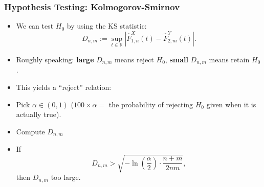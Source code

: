 \documentclass[aspectratio=169,xcolor=dvipsnames,11pt]{beamer}
\begin{document}
\begin{footnotesize}
\begin{frame}\frametitle{Hypothesis Testing: Kolmogorov-Smirnov}
\begin{block}{}
\begin{itemize}
\item We can test $H_0$ by using the KS statistic:
\[
D_{n,m} := \sup_{t \in \mathbb R} |\widehat{F}^{X}_{1,n}(t) - \widehat{F}^{Y}_{2,m}(t)|.
\]
\item Roughly speaking: \textbf{large} $D_{n,m}$ means reject $H_0$, \textbf{small} $D_{n,m}$ means retain $H_0$.\pause
\item This yields a ``reject'' relation: \pause
\item Pick $\alpha \in (0,1)$ ($100 \times \alpha =$  the probability of rejecting $H_0$ given when it is actually true).
\item \pause Compute $D_{n,m}$
\item \pause If
\[
    D_{n,m} > \sqrt{-\ln\left(\frac{\alpha}{2}\right)\cdot\frac{n+m}{2nm}},
\]
then $D_{n,m}$ too large.

\end{itemize}
\end{block}

\end{frame}


\end{footnotesize}
\end{document}
